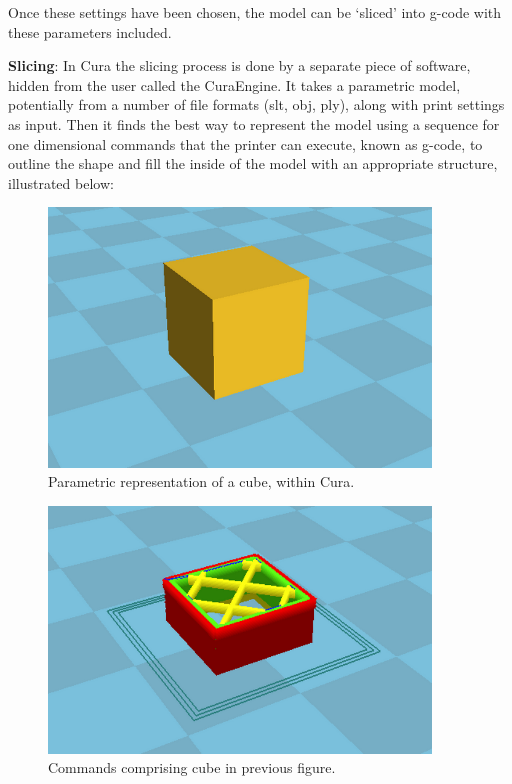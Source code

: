\documentclass[11pt]{report} %
\begin{document}
Once these settings have been chosen, the model can be `sliced' into g-code with these parameters included.

\textbf{Slicing}: In Cura the slicing process is done by a separate piece of software, hidden from the user called the CuraEngine. It takes a parametric model, potentially from a number of file formats (slt, obj, ply), along with print settings as input. Then it finds the best way to represent the model using a sequence for one dimensional commands that the printer can execute, known as g-code, to outline the shape and fill the inside of the model with an appropriate structure, illustrated below:

\begin{figure}[H]
  \centering
  \includegraphics[width=4in]{james_cura_top_fig.png}
  \caption{Parametric representation of a cube, within Cura.}
  \label{figure:JCtop}
\end{figure}

\begin{figure}[H]
  \centering
  \includegraphics[width=4in]{james_cura_bottom_fig.png}
  \caption{Commands comprising cube in previous figure.}
  \label{figure:JCbottom}
\end{figure}
\end{document}
